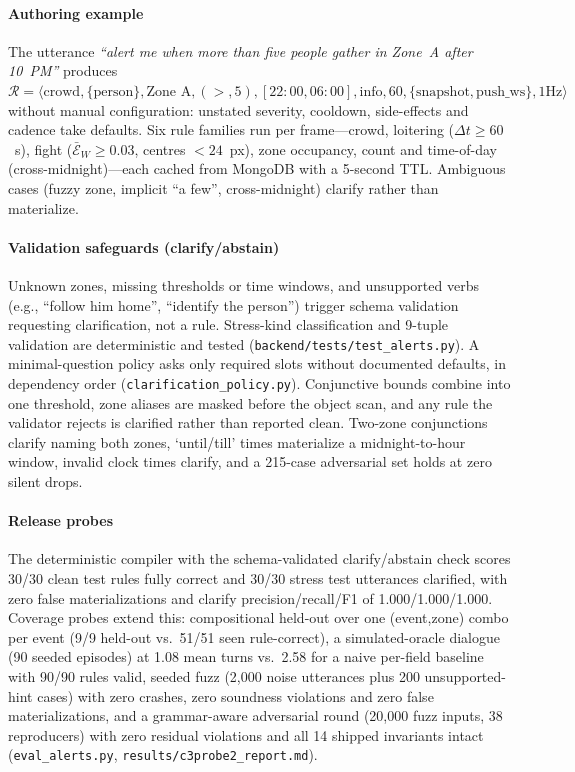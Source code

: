 ﻿\documentclass[conference]{IEEEtran}
\theoremstyle{plain}
\begin{document}
\paragraph*{Authoring example}
The utterance \textit{``alert me when more than five people gather in Zone~A after 10~PM''} produces $\mathcal{R} = \langle\text{crowd},\{\text{person}\},\text{Zone~A},({>},5),[22{:}00,06{:}00],\allowbreak\text{info},60,\{\text{snapshot},\text{push\_ws}\},1\text{Hz}\rangle$
without manual configuration: unstated severity, cooldown, side-effects and cadence take defaults. Six rule families run per frame---crowd, loitering ($\Delta t{\ge}60$~s), fight ($\bar{\mathcal{E}}_W{\ge}0.03$, centres $<24$~px), zone occupancy, count and time-of-day (cross-midnight)---each cached from MongoDB with a 5-second TTL. Ambiguous cases (fuzzy zone, implicit ``a few'', cross-midnight) clarify rather than materialize.

\paragraph*{Validation safeguards (clarify/abstain)}
Unknown zones, missing thresholds or time windows, and unsupported verbs (e.g., ``follow him home'', ``identify the person'') trigger schema validation requesting clarification, not a rule. Stress-kind classification and 9-tuple validation are deterministic and tested (\texttt{backend/\allowbreak tests/\allowbreak test\_\allowbreak alerts.py}). A minimal-question policy asks only required slots without documented defaults, in dependency order (\texttt{clarification\_\allowbreak policy.py}). Conjunctive bounds combine into one threshold, zone aliases are masked before the object scan, and any rule the validator rejects is clarified rather than reported clean. Two-zone conjunctions clarify naming both zones, `until/till' times materialize a midnight-to-hour window, invalid clock times clarify, and a 215-case adversarial set holds at zero silent drops.

\paragraph*{Release probes} The deterministic compiler with the schema-validated clarify/abstain check scores 30/30 clean test rules fully correct and 30/30 stress test utterances clarified, with zero false materializations and clarify precision/recall/F1 of 1.000/1.000/1.000. Coverage probes extend this: compositional held-out over one (event,zone) combo per event (9/9 held-out vs.\ 51/51 seen rule-correct), a simulated-oracle dialogue (90 seeded episodes) at 1.08 mean turns vs.\ 2.58 for a naive per-field baseline with 90/90 rules valid, seeded fuzz (2{,}000 noise utterances plus 200 unsupported-hint cases) with zero crashes, zero soundness violations and zero false materializations, and a grammar-aware adversarial round (20{,}000 fuzz inputs, 38 reproducers) with zero residual violations and all 14 shipped invariants intact (\texttt{eval\_\allowbreak alerts.py}, \texttt{results/c3probe2\_report.md}).
\end{document}
